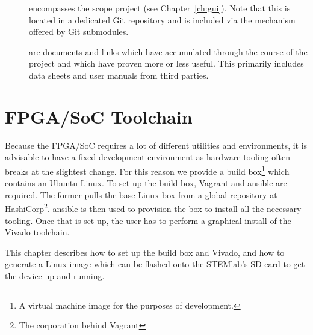 \begin{minipage}[t]{0.64\textwidth}
\begin{description}
        \item[]    encompasses    the    scope    project    (see
            Chapter~\ref{ch:gui}). Note that  this is  located in  a dedicated
            Git repository  and is included  via the mechanism offered  by Git
            submodules.

        \item[]   are   documents   and  links   which   have
            accumulated  through the  course  of the  project  and which  have
            proven more or  less useful.  This primarily  includes data sheets
            and user manuals from third parties.
    \end{description}
\end{minipage}
\vspace*{2ex}



%
%
\chapter{FPGA/SoC Toolchain} %
\label{ch:devguide:fpga_toolchain}

Because the FPGA/SoC requires a lot of different utilities and environments, it
is advisable to  have a fixed development environment as  hardware tooling often
breaks at the slightest change.
For this reason we  provide a build box\footnote{%
    A virtual machine image for the purposes of development.
}
which contains  an Ubuntu Linux. To set  up the build box, Vagrant  and ansible
are required.  The former pulls the base Linux box from a global repository at
HashiCorp\footnote{The corporation  behind Vagrant}.  ansible is then  used to
provision the box  to install all the necessary tooling. Once  that is set up,
the user has to perform a graphical install of the Vivado toolchain.

This chapter  describes how to  set up  the build box  and Vivado, and  how to
generate a Linux image which can be  flashed onto the STEMlab's SD card to get
the device up and running.

